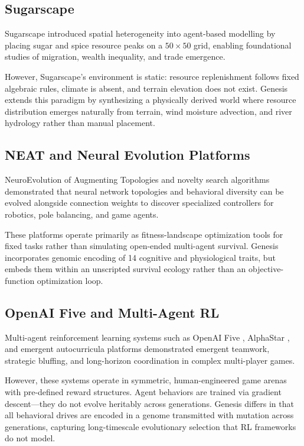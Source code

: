\documentclass[12pt,a4paper]{article}
\begin{document}
\subsection{Sugarscape}

Sugarscape \cite{epstein1996} introduced spatial heterogeneity into agent-based modelling by placing sugar and spice resource peaks on a $50{\times}50$ grid, enabling foundational studies of migration, wealth inequality, and trade emergence.

However, Sugarscape's environment is static: resource replenishment follows fixed algebraic rules, climate is absent, and terrain elevation does not exist. Genesis extends this paradigm by synthesizing a physically derived world where resource distribution emerges naturally from terrain, wind moisture advection, and river hydrology rather than manual placement.

\subsection{NEAT and Neural Evolution Platforms}

NeuroEvolution of Augmenting Topologies \cite{stanley2002} and novelty search algorithms \cite{lehman2011} demonstrated that neural network topologies and behavioral diversity can be evolved alongside connection weights to discover specialized controllers for robotics, pole balancing, and game agents.

These platforms operate primarily as fitness-landscape optimization tools for fixed tasks rather than simulating open-ended multi-agent survival. Genesis incorporates genomic encoding of 14 cognitive and physiological traits, but embeds them within an unscripted survival ecology rather than an objective-function optimization loop.

\subsection{OpenAI Five and Multi-Agent RL}

Multi-agent reinforcement learning systems such as OpenAI Five \cite{berner2019}, AlphaStar \cite{vinyals2019}, and emergent autocurricula platforms \cite{baker2020,ecoffet2021} demonstrated emergent teamwork, strategic bluffing, and long-horizon coordination in complex multi-player games.

However, these systems operate in symmetric, human-engineered game arenas with pre-defined reward structures. Agent behaviors are trained via gradient descent---they do not evolve heritably across generations. Genesis differs in that all behavioral drives are encoded in a genome transmitted with mutation across generations, capturing long-timescale evolutionary selection that RL frameworks do not model.
\end{document}
